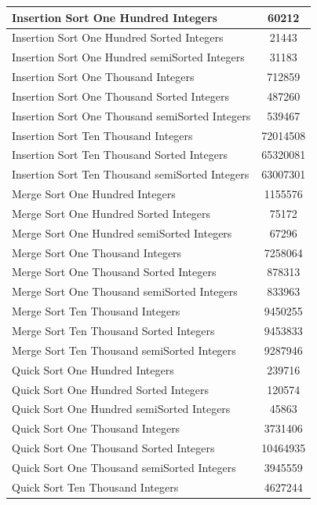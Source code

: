 \documentclass[]{article}
\begin{document}
	\begin{tabular}{|l|c|}
		\hline
		Insertion Sort One Hundred Integers & 60212\\
		\hline
		Insertion Sort One Hundred Sorted Integers & 21443\\
		\hline
		Insertion Sort One Hundred semiSorted Integers & 31183\\
		\hline
		Insertion Sort One Thousand Integers & 712859\\
		\hline
		Insertion Sort One Thousand Sorted Integers & 487260\\
		\hline
		Insertion Sort One Thousand semiSorted Integers & 539467\\
		\hline
		Insertion Sort Ten Thousand Integers & 72014508\\
		\hline
		Insertion Sort Ten Thousand Sorted Integers & 65320081\\
		\hline
		Insertion Sort Ten Thousand semiSorted Integers & 63007301\\
		\hline
		Merge Sort One Hundred Integers & 1155576\\
		\hline
		Merge Sort One Hundred Sorted Integers & 75172\\
		\hline
		Merge Sort One Hundred semiSorted Integers & 67296\\
		\hline
		Merge Sort One Thousand Integers & 7258064\\
		\hline
		Merge Sort One Thousand Sorted Integers & 878313\\
		\hline
		Merge Sort One Thousand semiSorted Integers & 833963\\
		\hline
		Merge Sort Ten Thousand Integers & 9450255\\
		\hline
		Merge Sort Ten Thousand Sorted Integers & 9453833\\
		\hline
		Merge Sort Ten Thousand semiSorted Integers & 9287946\\
		\hline
		Quick Sort One Hundred Integers & 239716\\
		\hline
		Quick Sort One Hundred Sorted Integers & 120574\\
		\hline
		Quick Sort One Hundred semiSorted Integers & 45863\\
		\hline
		Quick Sort One Thousand Integers & 3731406\\
		\hline
		Quick Sort One Thousand Sorted Integers & 10464935\\
		\hline
		Quick Sort One Thousand semiSorted Integers & 3945559\\
		\hline
		Quick Sort Ten Thousand Integers & 4627244\\

\end{tabular}
\end{document}
